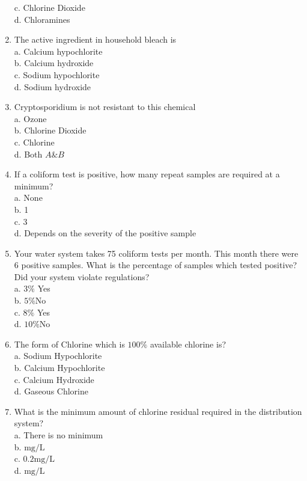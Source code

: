 \begin{enumerate}[1.]
c. Chlorine Dioxide\\
d. Chloramines\\
\item The active ingredient in household bleach is\\
a. Calcium hypochlorite\\
b. Calcium hydroxide\\
c. Sodium hypochlorite\\
d. Sodium hydroxide\\
\item Cryptosporidium is not resistant to this chemical\\
a. Ozone\\
b. Chlorine Dioxide\\
c. Chlorine\\
d. Both $A \& B$\\
\item If a coliform test is positive, how many repeat samples are required at a minimum?\\
a. None\\
b. 1\\
c. 3\\
d. Depends on the severity of the positive sample\\
\item Your water system takes 75 coliform tests per month. This month there were 6 positive samples. What is the percentage of samples which tested positive? Did your system violate regulations?\\
a. $3 \%$ Yes\\
b. $5 \% \mathrm{No}$\\
c. $8 \%$ Yes\\
d. $10 \% \mathrm{No}$\\
\item The form of Chlorine which is $100 \%$ available chlorine is?\\
a. Sodium Hypochlorite\\
b. Calcium Hypochlorite\\
c. Calcium Hydroxide\\
d. Gaseous Chlorine\\
\item What is the minimum amount of chlorine residual required in the distribution system?\\
a. There is no minimum\\
b. $\mathrm{mg} / \mathrm{L}$\\
c. $0.2 \mathrm{mg} / \mathrm{L}$\\
d. $\mathrm{mg} / \mathrm{L}$\\

\end{enumerate}
